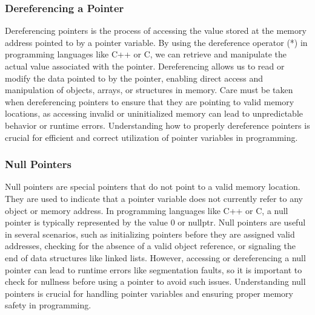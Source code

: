 \subsubsection{Dereferencing a Pointer}

Dereferencing pointers is the process of accessing the value stored at the memory address pointed to by a pointer variable. By using the dereference operator (*) in programming languages like C++ or C, we can retrieve and manipulate the actual 
value associated with the pointer. Dereferencing allows us to read or modify the data pointed to by the pointer, enabling direct access and manipulation of objects, arrays, or structures in memory. Care must be taken when dereferencing pointers 
to ensure that they are pointing to valid memory locations, as accessing invalid or uninitialized memory can lead to unpredictable behavior or runtime errors. Understanding how to properly dereference pointers is crucial for efficient and correct 
utilization of pointer variables in programming.

\subsubsection{Null Pointers}

Null pointers are special pointers that do not point to a valid memory location. They are used to indicate that a pointer variable does not currently refer to any object or memory address. In programming languages like C++ or C, a null pointer is 
typically represented by the value 0 or nullptr. Null pointers are useful in several scenarios, such as initializing pointers before they are assigned valid addresses, checking for the absence of a valid object reference, or signaling the end of 
data structures like linked lists. However, accessing or dereferencing a null pointer can lead to runtime errors like segmentation faults, so it is important to check for nullness before using a pointer to avoid such issues. Understanding null 
pointers is crucial for handling pointer variables and ensuring proper memory safety in programming.

